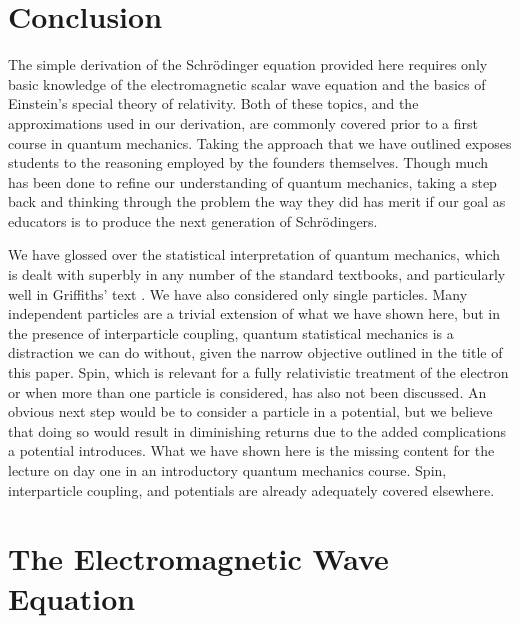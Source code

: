 \documentclass[preprint,footinbib,preprintnumbers,amsmath,amssymb,prb,12pt]{revtex4}
\begin{document}
\section{Conclusion}
The simple derivation of the Schr\"{o}dinger equation provided here requires only basic knowledge of the electromagnetic scalar wave equation and the basics of Einstein's special theory of relativity. Both of these topics, and the approximations used in our derivation, are commonly covered prior to a first course in quantum mechanics. Taking the approach that we have outlined exposes students to the reasoning employed by the founders themselves. Though much has been done to refine our understanding of quantum mechanics, taking a step back and thinking through the problem the way they did has merit if our goal as educators is to produce the next generation of Schr\"{o}dingers.

We have glossed over the statistical interpretation of quantum mechanics, which is dealt with superbly in any number of the standard textbooks, and particularly well in Griffiths' text \cite{griffiths}. We have also considered only single particles. Many independent particles are a trivial extension of what we have shown here, but in the presence of interparticle coupling, quantum statistical mechanics is a distraction we can do without, given the narrow objective outlined in the title of this paper. Spin, which is relevant for a fully relativistic treatment of the electron or when more than one particle is considered, has also not been discussed. An obvious next step would be to consider a particle in a potential, but we believe that doing so would result in diminishing returns due to the added complications a potential introduces. What we have shown here is the missing content for the lecture on day one in an introductory quantum mechanics course. Spin, interparticle coupling, and potentials are already adequately covered elsewhere. 

\appendix
\section{The Electromagnetic Wave Equation}
\end{document}
